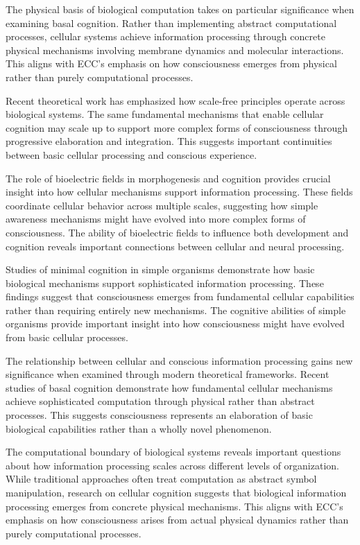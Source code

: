 The physical basis of biological computation \cite{Pattee2001} takes on particular significance when examining basal cognition. Rather than implementing abstract computational processes, cellular systems achieve information processing through concrete physical mechanisms involving membrane dynamics and molecular interactions. This aligns with ECC's emphasis on how consciousness emerges from physical rather than purely computational processes.

Recent theoretical work \cite{Fields2020} has emphasized how scale-free principles operate across biological systems. The same fundamental mechanisms that enable cellular cognition may scale up to support more complex forms of consciousness through progressive elaboration and integration. This suggests important continuities between basic cellular processing and conscious experience.

The role of bioelectric fields in morphogenesis and cognition \cite{Levin2019} provides crucial insight into how cellular mechanisms support information processing. These fields coordinate cellular behavior across multiple scales, suggesting how simple awareness mechanisms might have evolved into more complex forms of consciousness. The ability of bioelectric fields to influence both development and cognition reveals important connections between cellular and neural processing.

Studies of minimal cognition in simple organisms \cite{vanDuijn2006} demonstrate how basic biological mechanisms support sophisticated information processing. These findings suggest that consciousness emerges from fundamental cellular capabilities rather than requiring entirely new mechanisms. The cognitive abilities of simple organisms provide important insight into how consciousness might have evolved from basic cellular processes.

The relationship between cellular and conscious information processing \cite{Margulis2001} gains new significance when examined through modern theoretical frameworks. Recent studies of basal cognition \cite{Levin2018} demonstrate how fundamental cellular mechanisms achieve sophisticated computation through physical rather than abstract processes. This suggests consciousness represents an elaboration of basic biological capabilities rather than a wholly novel phenomenon.

The computational boundary of biological systems \cite{Levin2019} reveals important questions about how information processing scales across different levels of organization. While traditional approaches often treat computation as abstract symbol manipulation, research on cellular cognition suggests that biological information processing emerges from concrete physical mechanisms. This aligns with ECC's emphasis on how consciousness arises from actual physical dynamics rather than purely computational processes.

